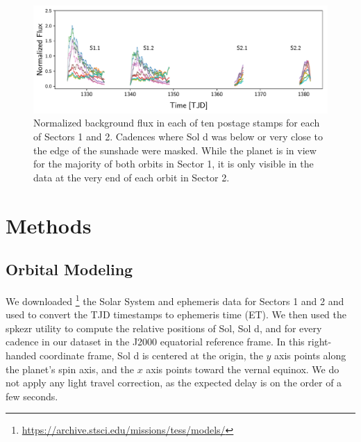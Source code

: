 \documentclass[modern]{aastex62}
\begin{document}
\begin{figure}[ht!]
    \begin{centering}
    \includegraphics[width=\linewidth]{figures/data.pdf}
    \caption{\label{fig:data}
             Normalized background flux in each of ten postage stamps
             for each of Sectors 1 and 2. Cadences where Sol d was
             below or very close to the edge of the sunshade were masked.
             While the planet is in view for the majority of both orbits
             in Sector 1, it is only visible in the data at the very end
             of each orbit in Sector 2.
             }
    \end{centering}
\end{figure}

\section{Methods}
\label{sec:methods}

\subsection{Orbital Modeling}
\label{sec:orbit}

We downloaded 
\footnote{\url{https://archive.stsci.edu/missions/tess/models/}}
the Solar System and \tess ephemeris data for
Sectors 1 and 2 and used \spiceypy \citep{Acton1996, Acton2017, Annex2017}
to convert the TJD timestamps to 
ephemeris time (ET). We then used the \textsf{spkezr} utility to compute
the relative positions of Sol, Sol d, and \tess for every cadence
in our dataset in the J2000 equatorial reference frame. In this right-handed
coordinate frame, Sol d is centered at the origin, the $y$ axis points along the 
planet's spin axis, and the $x$ axis points toward the vernal equinox. We
do not apply any light travel correction, as the expected delay is on the order
of a few seconds.
\end{document}
